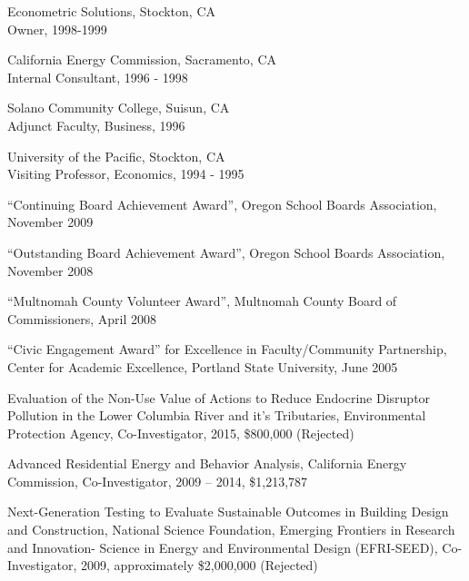 \documentclass[Computer Science]{vita}
\begin{document}
\begin{vita}
\begin{Experience}
  \item Econometric Solutions, Stockton, CA\\
    Owner, 1998-1999
		
  \item California Energy Commission, Sacramento, CA\\
    Internal Consultant, 1996 - 1998
	
  \item Solano Community College, Suisun, CA\\
    Adjunct Faculty, Business, 1996
		
  \item University of the Pacific, Stockton, CA\\
    Visiting Professor, Economics, 1994 - 1995

  \end{Experience}

  \begin{Honors}

  \item ``Continuing Board Achievement Award'', Oregon School Boards Association, November 2009

\item ``Outstanding Board Achievement Award'', Oregon School Boards Association, November 2008

\item ``Multnomah County Volunteer Award'', Multnomah County Board of Commissioners, April 2008

  \item ``Civic Engagement Award'' for Excellence in Faculty/Community
    Partnership, Center for Academic Excellence, Portland State
    University, June 2005

  \end{Honors}

  \begin{Grants and Sponsored Research}
\item Evaluation of the Non-Use Value of Actions to Reduce Endocrine Disruptor Pollution in the Lower Columbia River and it's Tributaries, Environmental Protection Agency, Co-Investigator, 2015, \$800,000 (Rejected)

\item Advanced Residential Energy and Behavior Analysis, California Energy Commission, Co-Investigator, 2009 -- 2014, \$1,213,787
  
\item Next-Generation Testing to Evaluate Sustainable Outcomes in Building Design and Construction, National Science Foundation, Emerging Frontiers in Research and Innovation- Science in Energy and Environmental Design (EFRI-SEED), Co-Investigator, 2009, approximately \$2,000,000 (Rejected)


\end{Grants and Sponsored Research}
\end{vita}
\end{document}
